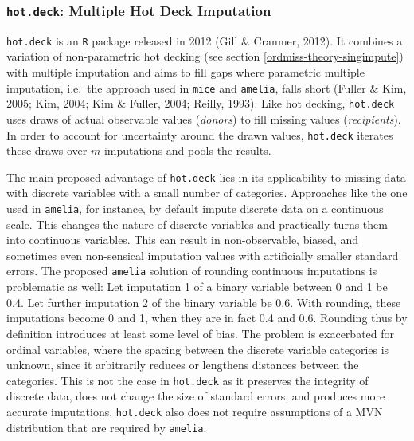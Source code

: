 \documentclass[12pt,econ]{sources/authesis}
\begin{document}
\hypertarget{ordmiss-theory-multimpute-hdnorm}{%
\subsubsection{\texorpdfstring{\texttt{hot.deck}: Multiple Hot Deck Imputation}{hot.deck: Multiple Hot Deck Imputation}}\label{ordmiss-theory-multimpute-hdnorm}}

\texttt{hot.deck} is an \texttt{R} package released in 2012 (Gill \& Cranmer, 2012). It combines a variation of non-parametric hot decking (see section \ref{ordmiss-theory-singimpute}) with multiple imputation and aims to fill gaps where parametric multiple imputation, i.e.~the approach used in \texttt{mice} and \texttt{amelia}, falls short (Fuller \& Kim, 2005; Kim, 2004; Kim \& Fuller, 2004; Reilly, 1993). Like hot decking, \texttt{hot.deck} uses draws of actual observable values (\textit{donors}) to fill missing values (\textit{recipients}). In order to account for uncertainty around the drawn values, \texttt{hot.deck} iterates these draws over \(m\) imputations and pools the results.

The main proposed advantage of \texttt{hot.deck} lies in its applicability to missing data with discrete variables with a small number of categories. Approaches like the one used in \texttt{amelia}, for instance, by default impute discrete data on a continuous scale. This changes the nature of discrete variables and practically turns them into continuous variables. This can result in non-observable, biased, and sometimes even non-sensical imputation values with artificially smaller standard errors. The proposed \texttt{amelia} solution of rounding continuous imputations is problematic as well: Let imputation 1 of a binary variable between 0 and 1 be 0.4. Let further imputation 2 of the binary variable be 0.6. With rounding, these imputations become 0 and 1, when they are in fact 0.4 and 0.6. Rounding thus by definition introduces at least some level of bias. The problem is exacerbated for ordinal variables, where the spacing between the discrete variable categories is unknown, since it arbitrarily reduces or lengthens distances between the categories. This is not the case in \texttt{hot.deck} as it preserves the integrity of discrete data, does not change the size of standard errors, and produces more accurate imputations. \texttt{hot.deck} also does not require assumptions of a MVN distribution that are required by \texttt{amelia}.
\end{document}
